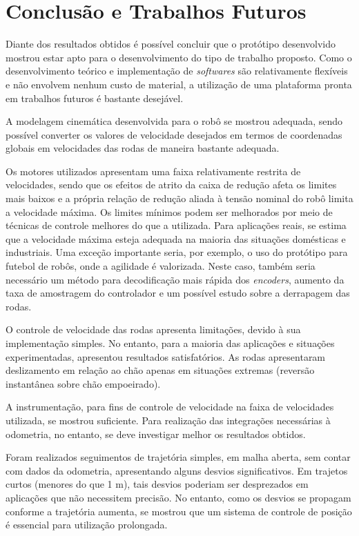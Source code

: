 \section{Conclusão e Trabalhos Futuros}
\label{sec:conclusao}


Diante dos resultados obtidos é possível concluir que o protótipo desenvolvido mostrou estar apto para o desenvolvimento do tipo de trabalho proposto. Como o desenvolvimento teórico e implementação de \textit{softwares} são relativamente flexíveis e não envolvem nenhum custo de material, a utilização de uma plataforma pronta em trabalhos futuros é bastante desejável.

A modelagem cinemática desenvolvida para o robô se mostrou adequada, sendo possível converter os valores de velocidade desejados em termos de coordenadas globais em velocidades das rodas de maneira bastante adequada.

Os motores utilizados apresentam uma faixa relativamente restrita de velocidades, sendo que os efeitos de atrito da caixa de redução afeta os limites mais baixos e a própria relação de redução aliada à tensão nominal do robô limita a velocidade máxima. Os limites mínimos podem ser melhorados por meio de técnicas de controle melhores do que a utilizada. Para aplicações reais, se estima que a velocidade máxima esteja adequada na maioria das situações domésticas e industriais. Uma exceção importante seria, por exemplo, o uso do protótipo para futebol de robôs, onde a agilidade é valorizada. Neste caso, também seria necessário um método para decodificação mais rápida dos \textit{encoders}, aumento da taxa de amostragem do controlador e um possível estudo sobre a derrapagem das rodas.

O controle de velocidade das rodas apresenta limitações, devido à sua implementação simples. No entanto, para a maioria das aplicações e situações experimentadas, apresentou resultados satisfatórios. As rodas apresentaram deslizamento em relação ao chão apenas em situações extremas (reversão instantânea sobre chão empoeirado).

A instrumentação, para fins de controle de velocidade na faixa de velocidades utilizada, se mostrou suficiente. Para realização das integrações necessárias à odometria, no entanto, se deve investigar melhor os resultados obtidos.

Foram realizados seguimentos de trajetória simples, em malha aberta, sem contar com dados da odometria, apresentando alguns desvios significativos. Em trajetos curtos (menores do que 1 m), tais desvios poderiam ser desprezados em aplicações que não necessitem precisão. No entanto, como os desvios se propagam conforme a trajetória aumenta, se mostrou que um sistema de controle de posição é essencial para utilização prolongada.

